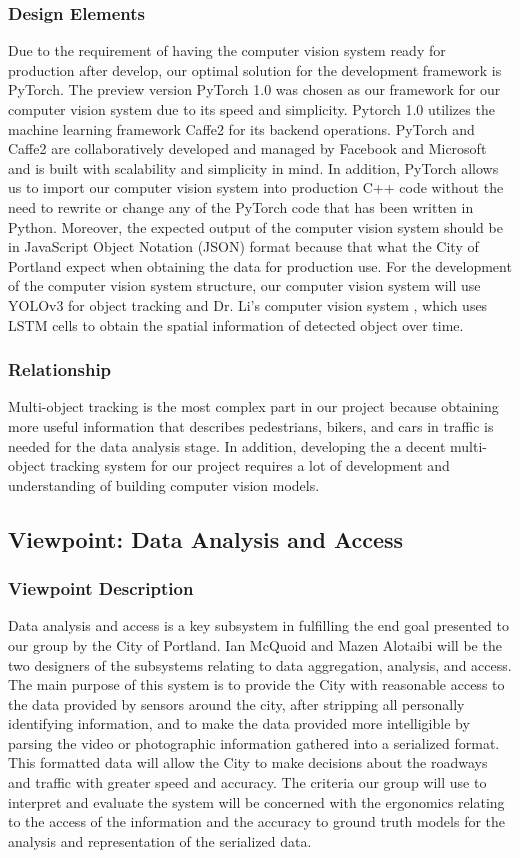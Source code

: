 \documentclass[onecolumn, draftclsnofoot,10pt, compsoc]{IEEEtran}
\begin{document}
\subsubsection{Design Elements}
Due to the requirement of having the computer vision system ready for production after develop, our optimal solution for the development framework is PyTorch. The preview version PyTorch 1.0 was chosen as our framework for our computer vision system due to its speed and simplicity. Pytorch 1.0 utilizes the machine learning framework Caffe2 for its backend operations. PyTorch and Caffe2 are collaboratively developed and managed by Facebook and Microsoft and is built with scalability and simplicity in mind. In addition, PyTorch allows us to import our computer vision system into production C++ code without the need to rewrite or change any of the PyTorch code that has been written in Python. Moreover, the expected output of the computer vision system should be in JavaScript Object Notation (JSON) format because that what the City of Portland expect when obtaining the data for production use. For the development of the computer vision system structure, our computer vision system will use YOLOv3 for object tracking and Dr. Li's computer vision system \cite{limodel}, which uses LSTM cells to obtain the spatial information of detected object over time.
\subsubsection{Relationship}
Multi-object tracking is the most complex part in our project because obtaining more useful information that describes pedestrians, bikers, and cars in traffic is needed for the data analysis stage. In addition, developing the a decent multi-object tracking system for our project requires a lot of development and understanding of building computer vision models.
\subsection{Viewpoint: Data Analysis and Access}
\subsubsection{Viewpoint Description}
Data analysis and access is a key subsystem in fulfilling the end goal presented to our group by the City of Portland. Ian McQuoid and Mazen Alotaibi will be the two designers of the subsystems relating to data aggregation, analysis, and access.  The main purpose of this system is to provide the City with reasonable access to the data provided by sensors around the city, after stripping all personally identifying information, and to make the data provided more intelligible by parsing the video or photographic information gathered into a serialized format. This formatted data will allow the City to make decisions about the roadways and traffic with greater speed and accuracy. The criteria our group will use to interpret and evaluate the system will be concerned with the ergonomics relating to the access of the information and the accuracy to ground truth models for the analysis and representation of the serialized data. 
\end{document}
